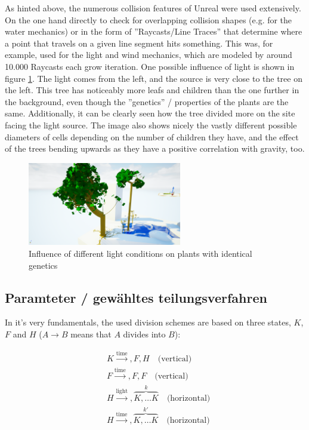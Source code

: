 \documentclass[11pt]{scrartcl}
\begin{document}
As hinted above, the numerous collision features of Unreal were used extensively. On the one hand directly to check for overlapping collision shapes (e.g. for the water mechanics) or in the form of ''Raycasts/Line Traces'' that determine where a point that travels on a given line segment hits something. This was, for example, used for the light and wind mechanics, which are modeled by around 10.000 Raycasts each grow iteration.
One possible influence of light is shown in figure \ref{fig:GrowToLight}. The light comes from the left, and the source is very close to the tree on the left. This tree has noticeably more leafs and children than the one further in the background, even though the ''genetics'' / properties of the plants are the same. Additionally, it can be clearly seen how the tree divided more on the site facing the light source. The image also shows nicely the vastly different possible diameters of cells depending on the number of children they have, and the effect of the trees bending upwards as they have a positive correlation with gravity, too. 

\begin{figure}
 	 \centering
 	    \includegraphics[width=0.6\textwidth]{SS_GrowToLight.png}
 	 \caption{Influence of different light conditions on plants with identical genetics}
 	 \label{fig:GrowToLight}
\end{figure}

\subsection{Paramteter / gewähltes teilungsverfahren}
In it's very fundamentals, the used division schemes are based on three states, $K$, $F$ and $H$ ($A \rightarrow B$ means that $A$ divides into $B$):

\begin{align}
	&K \xrightarrow {\text{time}}, F, H \quad \text{(vertical)} \label{eq:K} \\
	&F \xrightarrow {\text{time}}, F, F \quad \text{(vertical)} \label{eq:F}\\
	&H \xrightarrow {\text{light}}, \overbrace{ K, \ldots K}^{k} \quad \text{(horizontal)}  \label{eq:HLight} \\
	&H \xrightarrow {\text{time}}, \overbrace{ K, \ldots K}^{k'} \quad \text{(horizontal)} \label{eq:HTime}
\end{align}
\end{document}

